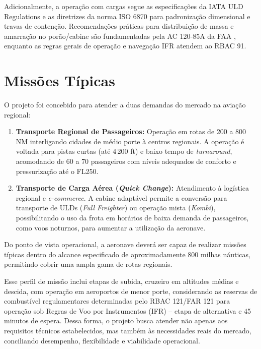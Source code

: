 Adicionalmente, a operação com cargas segue as especificações da IATA ULD Regulations \cite{iatauld} e as diretrizes da norma ISO 6870 \cite{iso4116} para padronização dimensional e travas de contenção. Recomendações práticas para distribuição de massa e amarração no porão/cabine são fundamentadas pela AC 120-85A da FAA \cite{ac12085}, enquanto as regras gerais de operação e navegação IFR atendem ao RBAC 91.

\section{Missões Típicas}

O projeto foi concebido para atender a duas demandas do mercado na aviação regional:

\begin{enumerate}
    \item \textbf{Transporte Regional de Passageiros:} Operação em rotas de 200 a 800 NM interligando cidades de médio porte à centros regionais. A operação é voltada para pistas curtas (até 4\,200 ft) e baixo tempo de \textit{turnaround}, acomodando de 60 a 70 passageiros com níveis adequados de conforto e pressurização até o FL250.

    \item \textbf{Transporte de Carga Aérea (\textit{Quick Change}):} Atendimento à logística regional e \textit{e-commerce}. A cabine adaptável permite a conversão para transporte de ULDs (\textit{Full Freighter}) ou operação mista (\textit{Kombi}), possibilitando o uso da frota em horários de baixa demanda de passageiros, como voos noturnos, para aumentar a utilização da aeronave. 
\end{enumerate}

Do ponto de vista operacional, a aeronave deverá ser capaz de realizar missões típicas dentro do alcance especificado de aproximadamente 800 milhas náuticas, permitindo cobrir uma ampla gama de rotas regionais.

Esse perfil de missão inclui etapas de subida, cruzeiro em altitudes médias e descida, com operação em aeroportos de menor porte, considerando as reservas de combustível regulamentares determinadas pelo RBAC 121/FAR 121 para operação sob Regras de Voo por Instrumentos (IFR) -- etapa de alternativa e 45 minutos de espera. Dessa forma, o projeto busca atender não apenas aos requisitos técnicos estabelecidos, mas também às necessidades reais do mercado, conciliando desempenho, flexibilidade e viabilidade operacional.